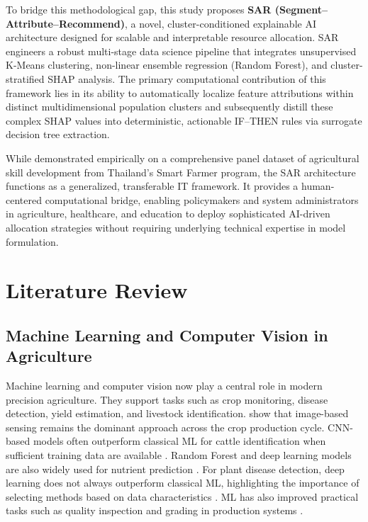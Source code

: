 \documentclass[3p,twocolumn,authoryear]{elsarticle}
\begin{document}
To bridge this methodological gap, this study proposes \textbf{SAR (Segment--Attribute--Recommend)}, a novel, cluster-conditioned explainable AI architecture designed for scalable and interpretable resource allocation. SAR engineers a robust multi-stage data science pipeline that integrates unsupervised K-Means clustering, non-linear ensemble regression (Random Forest), and cluster-stratified SHAP analysis. The primary computational contribution of this framework lies in its ability to automatically localize feature attributions within distinct multidimensional population clusters and subsequently distill these complex SHAP values into deterministic, actionable IF--THEN rules via surrogate decision tree extraction.

While demonstrated empirically on a comprehensive panel dataset of agricultural skill development from Thailand's Smart Farmer program, the SAR architecture functions as a generalized, transferable IT framework. It provides a human-centered computational bridge, enabling policymakers and system administrators in agriculture, healthcare, and education to deploy sophisticated AI-driven allocation strategies without requiring underlying technical expertise in model formulation.

\section{Literature Review}

\subsection{Machine Learning and Computer Vision in Agriculture}

Machine learning and computer vision now play a central role in modern precision
agriculture. They support tasks such as crop monitoring, disease detection,
yield estimation, and livestock identification. \citet{ghazal2024survey} show
that image-based sensing remains the dominant approach across the crop
production cycle. CNN-based models often outperform classical ML for cattle
identification when sufficient training data are available \citep{hossain2022cattle}.
Random Forest and deep learning models are also widely used for nutrient
prediction \citep{ennaji2023nutrient}. For plant disease detection, deep
learning does not always outperform classical ML, highlighting the importance of
selecting methods based on data characteristics \citep{omaye2024disease}. ML has
also improved practical tasks such as quality inspection and grading in
production systems \citep{wonggasem2024}.
\end{document}
